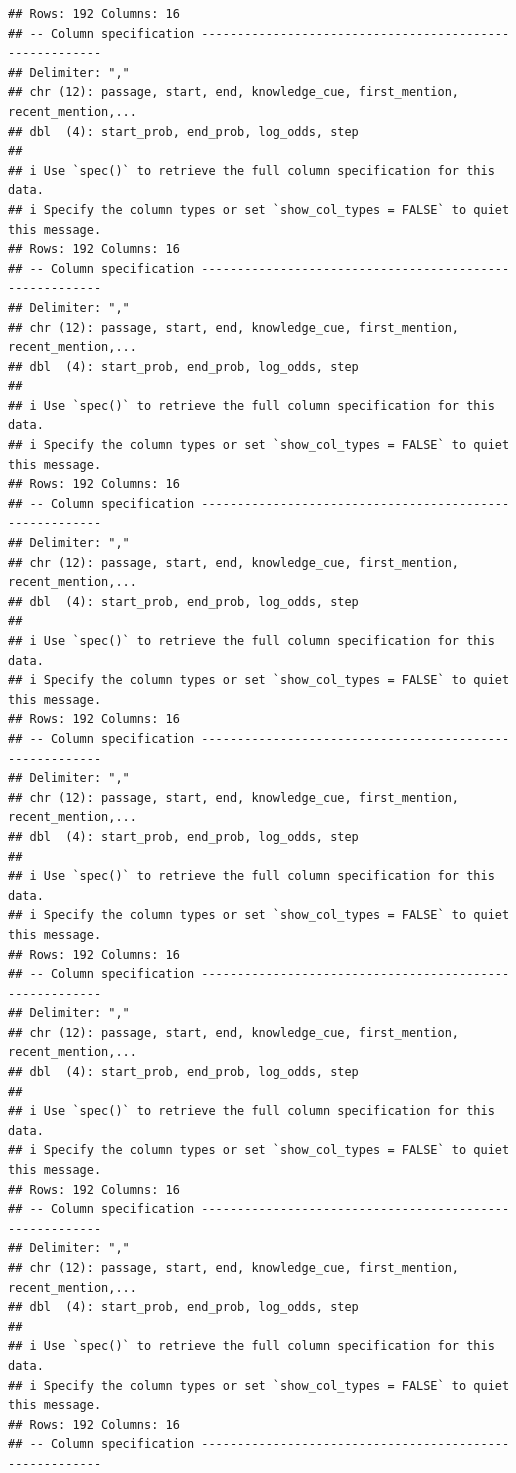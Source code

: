 \documentclass[
]{article}
\begin{document}
\begin{verbatim}
## Rows: 192 Columns: 16
## -- Column specification --------------------------------------------------------
## Delimiter: ","
## chr (12): passage, start, end, knowledge_cue, first_mention, recent_mention,...
## dbl  (4): start_prob, end_prob, log_odds, step
## 
## i Use `spec()` to retrieve the full column specification for this data.
## i Specify the column types or set `show_col_types = FALSE` to quiet this message.
## Rows: 192 Columns: 16
## -- Column specification --------------------------------------------------------
## Delimiter: ","
## chr (12): passage, start, end, knowledge_cue, first_mention, recent_mention,...
## dbl  (4): start_prob, end_prob, log_odds, step
## 
## i Use `spec()` to retrieve the full column specification for this data.
## i Specify the column types or set `show_col_types = FALSE` to quiet this message.
## Rows: 192 Columns: 16
## -- Column specification --------------------------------------------------------
## Delimiter: ","
## chr (12): passage, start, end, knowledge_cue, first_mention, recent_mention,...
## dbl  (4): start_prob, end_prob, log_odds, step
## 
## i Use `spec()` to retrieve the full column specification for this data.
## i Specify the column types or set `show_col_types = FALSE` to quiet this message.
## Rows: 192 Columns: 16
## -- Column specification --------------------------------------------------------
## Delimiter: ","
## chr (12): passage, start, end, knowledge_cue, first_mention, recent_mention,...
## dbl  (4): start_prob, end_prob, log_odds, step
## 
## i Use `spec()` to retrieve the full column specification for this data.
## i Specify the column types or set `show_col_types = FALSE` to quiet this message.
## Rows: 192 Columns: 16
## -- Column specification --------------------------------------------------------
## Delimiter: ","
## chr (12): passage, start, end, knowledge_cue, first_mention, recent_mention,...
## dbl  (4): start_prob, end_prob, log_odds, step
## 
## i Use `spec()` to retrieve the full column specification for this data.
## i Specify the column types or set `show_col_types = FALSE` to quiet this message.
## Rows: 192 Columns: 16
## -- Column specification --------------------------------------------------------
## Delimiter: ","
## chr (12): passage, start, end, knowledge_cue, first_mention, recent_mention,...
## dbl  (4): start_prob, end_prob, log_odds, step
## 
## i Use `spec()` to retrieve the full column specification for this data.
## i Specify the column types or set `show_col_types = FALSE` to quiet this message.
## Rows: 192 Columns: 16
## -- Column specification --------------------------------------------------------

\end{verbatim}
\end{document}
